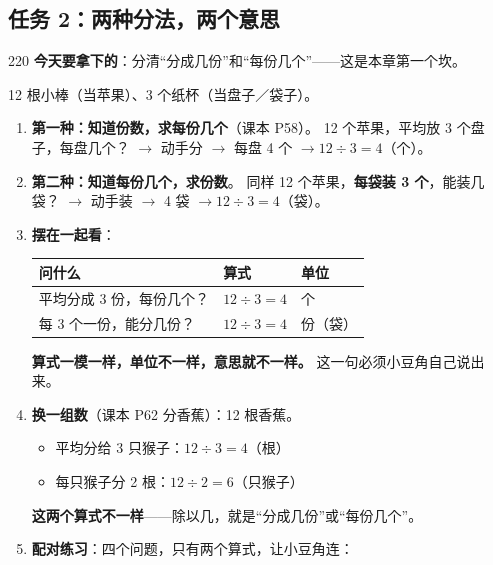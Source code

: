 \subsection{任务 2：两种分法，两个意思}

\begin{lesson}{2}{20}
\textbf{今天要拿下的}：分清“分成几份”和“每份几个”——这是本章第一个坎。

\begin{materials}
12 根小棒（当苹果）、3 个纸杯（当盘子／袋子）。
\end{materials}

\begin{enumerate}
  \item \textbf{第一种：知道份数，求每份几个}（课本 P58）。
        12 个苹果，平均放 3 个盘子，每盘几个？
        $\to$ 动手分 $\to$ 每盘 4 个 $\to 12\div3=4$（个）。
  \item \textbf{第二种：知道每份几个，求份数}。
        同样 12 个苹果，\textbf{每袋装 3 个}，能装几袋？
        $\to$ 动手装 $\to$ 4 袋 $\to 12\div3=4$（袋）。
  \item \textbf{摆在一起看}：
        \begin{center}
        \small
        \begin{tabular}{@{}lll@{}}
        \toprule
        \textbf{问什么} & \textbf{算式} & \textbf{单位} \\
        \midrule
        平均分成 3 份，每份几个？ & $12\div3=4$ & 个 \\
        每 3 个一份，能分几份？ & $12\div3=4$ & 份（袋）\\
        \bottomrule
        \end{tabular}
        \end{center}
        \textbf{算式一模一样，单位不一样，意思就不一样。}
        这一句必须小豆角自己说出来。
  \item \textbf{换一组数}（课本 P62 分香蕉）：12 根香蕉。
        \begin{itemize}
          \item 平均分给 3 只猴子：$12\div3=4$（根）
          \item 每只猴子分 2 根：$12\div2=6$（只猴子）
        \end{itemize}
        \textbf{这两个算式不一样}——除以几，就是“分成几份”或“每份几个”。
  \item \textbf{配对练习}：四个问题，只有两个算式，让小豆角连：
        \begin{center}
        \small
        \begin{tabularx}{\linewidth}{@{}p{7.2cm}X@{}}

\end{tabularx}
\end{center}
\end{enumerate}
\end{lesson}
